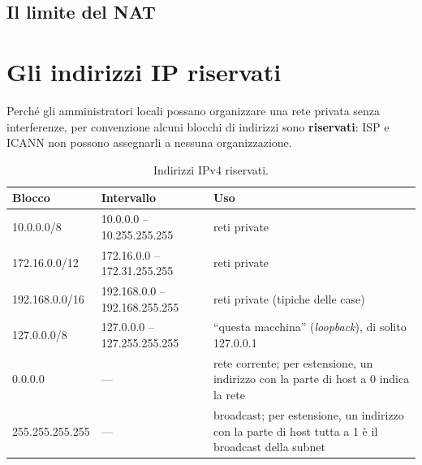 \subsection{Il limite del NAT}


\section{Gli indirizzi IP riservati}

Perché gli amministratori locali possano organizzare una rete privata senza interferenze, per convenzione alcuni blocchi di
indirizzi sono \textbf{riservati}: ISP e ICANN non possono assegnarli a nessuna organizzazione.

\begin{table}[H]
\centering
\begin{tabular}{llp{7.5cm}}
\toprule
\textbf{Blocco} & \textbf{Intervallo} & \textbf{Uso} \\
\midrule
10.0.0.0/8 & 10.0.0.0 -- 10.255.255.255 & reti private \\
172.16.0.0/12 & 172.16.0.0 -- 172.31.255.255 & reti private \\
192.168.0.0/16 & 192.168.0.0 -- 192.168.255.255 & reti private (tipiche delle case) \\
127.0.0.0/8 & 127.0.0.0 -- 127.255.255.255 & ``questa macchina'' (\emph{loopback}), di solito 127.0.0.1 \\
0.0.0.0 & --- & rete corrente; per estensione, un indirizzo con la parte di host a 0 indica la rete \\
255.255.255.255 & --- & broadcast; per estensione, un indirizzo con la parte di host tutta a 1 è il broadcast della subnet \\
\bottomrule
\end{tabular}
\caption{Indirizzi IPv4 riservati.}
\end{table}

